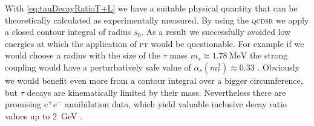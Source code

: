 \documentclass[../../index.tex]{subfiles}
\begin{document}
With \cref{eq:tauDecayRatioT+L} we have a suitable physical quantity that can be
theoretically calculated as experimentally measured. By using the \textsc{qcdsr}
we apply a closed contour integral of radius \(s_0\). As a result we
successfully avoided low energies at which the application of \textsc{pt} would
be questionable. For example if we would choose a radius with the size of the
\(\tau\) mass \(m_\tau \approx \SI{1.78}{\mega\eV}\) the strong coupling would
have a perturbatively safe value of \(\alpha_s(m_\tau^2)\approx 0.33\)
\cite{Pich2016}. Obviously we would benefit even more from a contour integral
over a bigger circumference, but \(\tau\) decays are kinematically limited by
their mass. Nevertheless there are promising \(e^+e^-\) annihilation data, which
yield valuable inclusive decay ratio values up to \SI{2}{\giga\eV}
\cite{Boito2018}\cite{Keshavarzi2018}.
\end{document}
